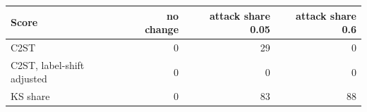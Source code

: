 \begin{tabular}{lrrr}
\toprule
Score & no change & attack share 0.05 & attack share 0.6 \\
\midrule
C2ST & 0 & 29 & 0 \\
C2ST, label-shift adjusted & 0 & 0 & 0 \\
KS share & 0 & 83 & 88 \\
\bottomrule
\end{tabular}

